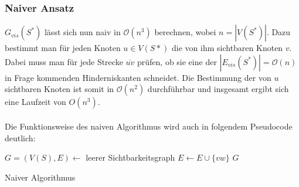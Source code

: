\documentclass[a4paper, notitlepage, 12pt]{scrartcl}
\begin{document}
 \subsubsection{Naiver Ansatz}
 $G_{vis}(S^{*})$ lässt sich nun naiv in $\mathcal{O}(n^3)$ berechnen, wobei $n = |V(S^*)|$. Dazu bestimmt man für jeden Knoten $u \in V(S*)$ die von ihm sichtbaren Knoten $v$. Dabei muss man für jede Strecke $\overline{uv}$ prüfen, ob sie eine der $|E_{vis}(S^*)| = \mathcal{O}(n)$ in Frage kommenden Hinderniskanten schneidet. Die Bestimmung der von $u$ sichtbaren Knoten ist somit in $\mathcal{O}(n^2)$ durchführbar und insgesamt ergibt sich eine Laufzeit von $O(n^3)$. \\ \\
 Die Funktionsweise des naiven Algorithmus wird auch in folgendem Pseudocode deutlich: 
 \begin{algorithm}[H]
 \begin{algorithmic}
 	\State $G = (V(S),E) \gets$ leerer Sichtbarkeitsgraph
 	\State $E \gets E \cup \{vw\}$
 	\EndIf
 	\EndFor
 	\EndFor
 	\EndFor
 	\State \Return $G$
 	\EndFunction
 \end{algorithmic}
\caption{Naiver Algorithmus}
\end{algorithm} ~\\
\end{document}
